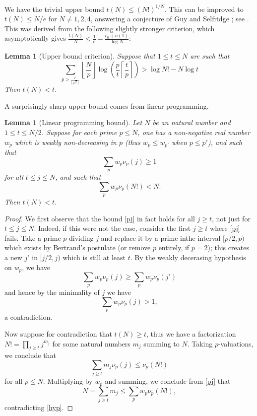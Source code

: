 \documentclass[12pt,a4paper,reqno]{amsart}
\numberwithin{equation}{section}
\theoremstyle{plain}
\newtheorem{lemma}[theorem]{Lemma}
\theoremstyle{definition}
\begin{document}
We have the trivial upper bound $t(N) \leq (N!)^{1/N}$.  This can be improved to $t(N) \leq N/e$ for $N \neq 1,2,4$, answering a conjecture of Guy and Selfridge \cite{guy-selfridge}; see \cite{tao}.  This was derived from the following slightly stronger criterion, which asymptotically gives $\frac{t(N)}{N} \leq \frac{1}{e} - \frac{c_0+o(1)}{\log N}$:

\begin{lemma}[Upper bound criterion]\label{upper-crit}  \cite[Lemma 2.1]{tao} Suppose that $1 \leq t \leq N$ are such that
  \begin{equation}\label{contra}
     \sum_{p > \frac{t}{\lfloor\sqrt{t}\rfloor}} \left\lfloor \frac{N}{p} \right\rfloor \log \left( \frac{p}{t} \left\lceil \frac{t}{p} \right\rceil \right) > \log N! - N \log t
  \end{equation}
  Then $t(N) < t$.
  \end{lemma}

A surprisingly sharp upper bound comes from linear programming.

\begin{lemma}[Linear programming bound]\label{lp-upper}  Let $N$ be an natural number and $1 \leq t \leq N/2$.  Suppose for each prime $p \leq N$, one has a non-negative real number $w_p$ which is weakly non-decreasing in $p$ (thus $w_p \leq w_{p'}$ when $p \leq p'$), and such that
\begin{equation}\label{pj}
 \sum_p w_p \nu_p(j) \geq 1
\end{equation}
for all $t \leq j \leq N$, and such that
\begin{equation}\label{hyp}
\sum_p w_p \nu_p(N!) < N.
\end{equation}
Then $t(N) < t$.
\end{lemma}

\begin{proof}
We first observe that the bound \eqref{pj} in fact holds for all $j \geq t$, not just for $t \leq j \leq N$.  Indeed, if this were not the case, consider the first $j \geq t$ where \eqref{pj} fails.  Take a prime $p$ dividing $j$ and replace it by a prime inthe interval $[p/2,p)$ which exists by Bertrand's postulate (or remove $p$ entirely, if $p=2$); this creates a new $j'$ in $[j/2,j)$ which is still at least $t$.  By the weakly decerasing hypothesis on $w_p$, we have
$$ \sum_p w_p \nu_p(j) \geq \sum_p w_p \nu_p(j')$$
and hence by the minimality of $j$ we have
$$ \sum_p w_p \nu_p(j) > 1, $$
a contradiction.

Now suppose for contradiction that $t(N) \geq t$, thus we have a factorization $N! = \prod_{j \geq t} j^{m_j}$ for some natural numbers $m_j$ summing to $N$.  Taking $p$-valuations, we conclude that
$$ \sum_{j \geq t} m_j \nu_p(j) \leq \nu_p(N!)$$
for all $p \leq N$.  Multiplying by $w_p$ and summing, we conclude from \eqref{pj} that
$$ N = \sum_{j \geq t} m_j \leq \sum_p w_p \nu_p(N!),$$
contradicting \eqref{hyp}.
\end{proof}
\end{document}
